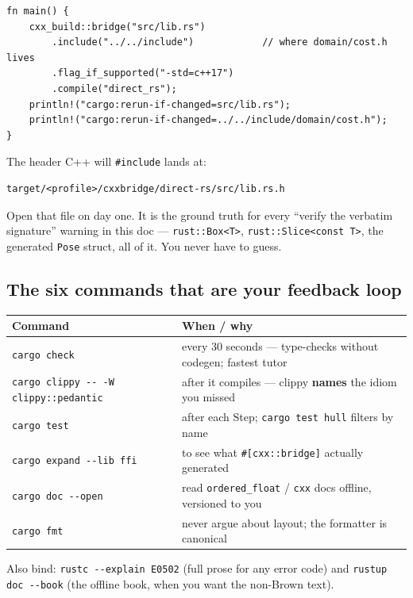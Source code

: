 \documentclass[11pt]{article}
\begin{document}
\begin{verbatim}
fn main() {
    cxx_build::bridge("src/lib.rs")
        .include("../../include")            // where domain/cost.h lives
        .flag_if_supported("-std=c++17")
        .compile("direct_rs");
    println!("cargo:rerun-if-changed=src/lib.rs");
    println!("cargo:rerun-if-changed=../../include/domain/cost.h");
}
\end{verbatim}

The header C++ will \texttt{\#include} lands at:

\begin{verbatim}
target/<profile>/cxxbridge/direct-rs/src/lib.rs.h
\end{verbatim}

Open that file on day one. It is the ground truth for every ``verify the
verbatim signature'' warning in this doc — \texttt{rust::Box<T>}, \texttt{rust::Slice<const
T>}, the generated \texttt{Pose} struct, all of it. You never have to guess.
\subsection{The six commands that are your feedback loop}
\label{sec:org4a84b2f}

\begin{center}
\begin{tabular}{ll}
Command & When / why\\
\hline
\texttt{cargo check} & every 30 seconds — type-checks without codegen; fastest tutor\\
\texttt{cargo clippy -{}-{} -W clippy::pedantic} & after it compiles — clippy \textbf{names} the idiom you missed\\
\texttt{cargo test} & after each Step; \texttt{cargo test hull} filters by name\\
\texttt{cargo expand -{}-{}lib ffi} & to see what \texttt{\#[cxx::bridge]} actually generated\\
\texttt{cargo doc -{}-{}open} & read \texttt{ordered\_float} / \texttt{cxx} docs offline, versioned to you\\
\texttt{cargo fmt} & never argue about layout; the formatter is canonical\\
\end{tabular}
\end{center}

Also bind: \texttt{rustc -{}-{}explain E0502} (full prose for any error code) and
\texttt{rustup doc -{}-{}book} (the offline book, when you want the non-Brown text).
\end{document}
